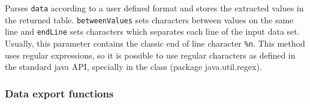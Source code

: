 \begin{tabb}
   Parses \texttt{data} according to a user defined format and stores the
 extracted values in the returned table. \texttt{betweenValues} sets
  characters between values on the same line and \texttt{endLine} sets
  characters which separates each line of the input data set. Usually, this
  parameter contains the classic end of line character \texttt{\%n}.
   This method uses regular expressions, so it is possible to use regular
  characters as defined in the standard java API, specially in the class
   (package java.util.regex).
\end{tabb}
\begin{tabb}
\end{tabb}
\begin{htmlonly}
\end{htmlonly}

\subsubsection*{Data export functions}

